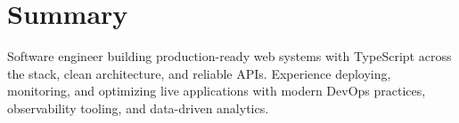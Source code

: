 \section{Summary}
Software engineer building production-ready web systems with TypeScript across the stack, clean architecture, and reliable APIs. Experience deploying, monitoring, and optimizing live applications with modern DevOps practices, observability tooling, and data-driven analytics.
